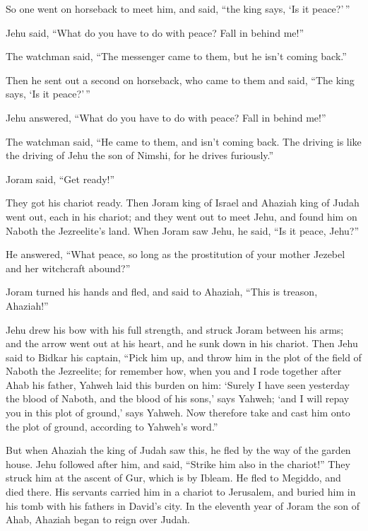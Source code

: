 \begin{paracol}{2}
\begin{otherlanguage}{english}
 So one went on horseback to meet him, and said, ``the
king says, `Is it peace?'\,''

Jehu said, ``What do you have to do with peace? Fall in behind me!''

The watchman said, ``The messenger came to them, but he isn't coming
back.''

 Then he sent out a second on horseback, who came to them
and said, ``The king says, `Is it peace?'\,''

Jehu answered, ``What do you have to do with peace? Fall in behind me!''

 The watchman said, ``He came to them, and isn't coming
back. The driving is like the driving of Jehu the son of Nimshi, for he
drives furiously.''

 Joram said, ``Get ready!''

They got his chariot ready. Then Joram king of Israel and Ahaziah king
of Judah went out, each in his chariot; and they went out to meet Jehu,
and found him on Naboth the Jezreelite's land.  When
Joram saw Jehu, he said, ``Is it peace, Jehu?''

He answered, ``What peace, so long as the prostitution of your mother
Jezebel and her witchcraft abound?''

 Joram turned his hands and fled, and said to Ahaziah,
``This is treason, Ahaziah!''

 Jehu drew his bow with his full strength, and struck
Joram between his arms; and the arrow went out at his heart, and he sunk
down in his chariot.  Then Jehu said to Bidkar his
captain, ``Pick him up, and throw him in the plot of the field of Naboth
the Jezreelite; for remember how, when you and I rode together after
Ahab his father, Yahweh laid this burden on him:  `Surely
I have seen yesterday the blood of Naboth, and the blood of his sons,'
says Yahweh; `and I will repay you in this plot of ground,' says Yahweh.
Now therefore take and cast him onto the plot of ground, according to
Yahweh's word.''

 But when Ahaziah the king of Judah saw this, he fled by
the way of the garden house. Jehu followed after him, and said, ``Strike
him also in the chariot!'' They struck him at the ascent of Gur, which
is by Ibleam. He fled to Megiddo, and died there.  His
servants carried him in a chariot to Jerusalem, and buried him in his
tomb with his fathers in David's city.  In the eleventh
year of Joram the son of Ahab, Ahaziah began to reign over Judah.


\end{otherlanguage}
\end{paracol}

